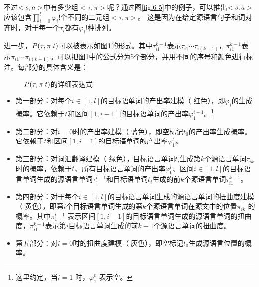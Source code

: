 \parinterval 不过$<{s},{a}>$中有多少组$<\tau,\pi>$呢？通过图\ref{fig:6-5}中的例子，可以推出$<{s},{a}>$应该包含$\prod_{i=0}^{l}{\varphi_i !}$个不同的二元组$<\tau,\pi>$。 这是因为在给定源语言句子和词对齐时，对于每一个$\tau_i$都有$\varphi_{i}!$种排列。


\parinterval 进一步，${P}(\tau,\pi|{t})$可以被表示如图\ref{fig:6-7}的形式。其中$\tau_{i1}^{k-1}$表示$\tau_{i1}\cdots \tau_{i(k-1)}$，$\pi_{i1}^{ k-1}$表示$\pi_{i1}\cdots \pi_{i(k-1)}$。可以把图\ref{fig:6-7}中的公式分为5个部分，并用不同的序号和颜色进行标注。每部分的具体含义是：

\begin{figure}[htp]
    \centering

   \caption{{${P}(\tau,\pi|t)$}的详细表达式}
\setlength{\belowcaptionskip}{-0.5em}
   \label{fig:6-7}
\end{figure}

\begin{itemize}
\item 第一部分：对每个$i\in[1,l]$的目标语单词的产出率建模（{\color{red!70} 红色}），即$\varphi_i$的生成概率。它依赖于${t}$和区间$[1,i-1]$的目标语单词的产出率$\varphi_1^{i-1}$。\footnote{这里约定，当$i=1$ 时，$\varphi_1^0$ 表示空。}
\vspace{0.5em}
\item 第二部分：对$i=0$时的产出率建模（{\color{blue!70} 蓝色}），即空标记$t_0$的产出率生成概率。它依赖于${t}$和区间$[1,i-1]$的目标语单词的产出率$\varphi_1^l$。
\vspace{0.5em}
\item 第三部分：对词汇翻译建模（{\color{green!70} 绿色}），目标语言单词$t_i$生成第$k$个源语言单词$\tau_{ik}$时的概率，依赖于${t}$、所有目标语言单词的产出率$\varphi_0^l$、区间$i\in[1,l]$的目标语言单词生成的源语言单词$\tau_1^{i-1}$和目标语单词$t_i$生成的前$k$个源语言单词$\tau_{i1}^{k-1}$。
\vspace{0.5em}
\item 第四部分：对于每个$i\in[1,l]$的目标语言单词生成的源语言单词的扭曲度建模（{\color{yellow!70!black} 黄色}），即第$i$个目标语言单词生成的第$k$个源语言单词在源文中的位置$\pi_{ik}$ 的概率。其中$\pi_1^{i-1}$ 表示区间$[1,i-1]$的目标语言单词生成的源语言单词的扭曲度，$\pi_{i1}^{k-1}$表示第$i$目标语言单词生成的前$k-1$个源语言单词的扭曲度。
\vspace{0.5em}
\item 第五部分：对$i=0$时的扭曲度建模（{\color{gray!70} 灰色}），即空标记$t_0$生成源语言位置的概率。
\end{itemize}

